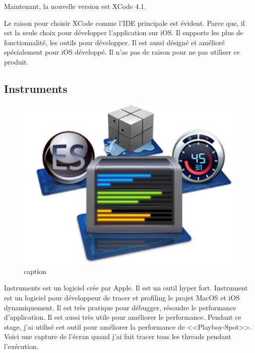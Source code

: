 Maintenant, la nouvelle version est XCode 4.1. 

Le raison pour choisir XCode comme l'IDE principale est évident. Parce que, il est la seule choix pour développer l'application sur iOS. Il supporte les plus de fonctionnalité, les outils pour développer. Il est aussi désigné et amélioré spécialement pour iOS développé. Il n'as pas de raison pour ne pas utiliser ce produit.


\subsection{Instruments} %
\label{sub:instrument}

\begin{figure}[htbp]
	\centering
		\includegraphics[width=6in]{Image/instrumentslogo.jpg}
	\caption{caption}
	\label{fig:Image_instrumentslogo}
\end{figure}

Instruments est un logiciel crée par Apple. Il est un outil hyper fort. Instrument est un logiciel pour développeur de tracer et profiling le projet MacOS et iOS dynamiquement. Il est très pratique pour débugger, résoudre le performance d'application. Il est aussi très utile pour améliorer le performance. Pendant ce stage, j'ai utilisé cet outil pour améliorer la performance de <<Playboy-Spot>>. 
Voici une capture de l'écran quand j'ai fait tracer tous les threads pendant l'exécution. 


